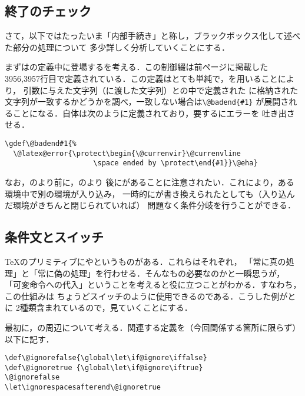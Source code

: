 \documentclass[autodetect-engine,dvipdfmx]{jsarticle}
\begin{document}
\subsection{終了のチェック}

さて，以下ではたったいま「内部手続き」と称し，ブラックボックス化して述べた部分の処理について
多少詳しく分析していくことにする．

まずはの定義中に登場するを考える．この制御綴は前ページに掲載した
3956,3957行目で定義されている．この定義はとても単純で，を用いることにより，
引数に与えた文字列（に渡した文字列）との中で定義された
に格納された文字列が一致するかどうかを調べ，一致しない場合は\preSub\verb|\@badend{#1}|\preSub
が展開されることになる．自体は次のように定義されており，要するにエラーを
吐き出させる．

\begin{lstlisting}[firstnumber=1074]
\gdef\@badend#1{%
  \@latex@error{\protect\begin{\@currenvir}\@currenvline
                     \space ended by \protect\end{#1}}\@eha}
\end{lstlisting}

なお，のより前に，のより
後にがあることに注意されたい．これにより，ある環境中で別の環境が入り込み，
一時的にが書き換えられたとしても（入り込んだ環境がきちんと閉じられていれば）
問題なく条件分岐を行うことができる．


\subsection{条件文とスイッチ}

\TeX のプリミティブにやというものがある．これらはそれぞれ，
「常に真の処理」と「常に偽の処理」を行わせる．そんなもの必要なのかと一瞬思うが，
「可変命令への代入」ということを考えると役に立つことがわかる．すなわち，この仕組みは
ちょうどスイッチのように使用できるのである．こうした例がとに
2種類含まれているので，見ていくことにする．

最初に，の周辺について考える．関連する定義を（今回関係する箇所に限らず）
以下に記す．
\begin{lstlisting}[firstnumber=1389]
\def\@ignorefalse{\global\let\if@ignore\iffalse}
\def\@ignoretrue {\global\let\if@ignore\iftrue}
\@ignorefalse
\let\ignorespacesafterend\@ignoretrue
\end{lstlisting}
\end{document}
